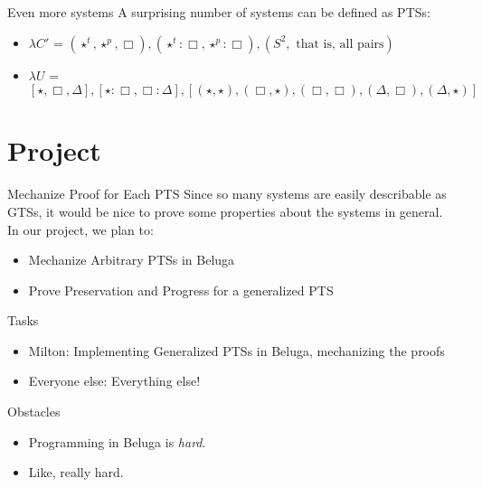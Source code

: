 \documentclass{beamer}
\begin{document}
    \begin{frame}{Even more systems}
        A surprising number of systems can be defined as PTSs:
        \begin{itemize}
            \item<1-> $\lambda C'$ = $(\star^t, \star^p, \Box), (\star^t : \Box, \star^p : \Box), (S^2, \text{ that is, all pairs})$
            \item<2-> $\lambda U$ = $[\star, \Box, \Delta], [\star : \Box, \Box : \Delta], [(\star, \star), (\Box, \star), (\Box, \Box), (\Delta, \Box), (\Delta, \star)]$
        \end{itemize}
    \end{frame}

    \section{Project}

    \begin{frame}{Mechanize Proof for Each PTS}
        Since so many systems are easily describable as GTSs, it would be nice to prove some properties about the systems in general. \\
        In our project, we plan to: 
        \begin{itemize}
            \item<1-> Mechanize Arbitrary PTSs in Beluga
            \item<2-> Prove Preservation and Progress for a generalized PTS
        \end{itemize}
    \end{frame}

    \begin{frame}{Tasks}
        \begin{itemize}
            \item<1-> Milton: Implementing Generalized PTSs in Beluga, mechanizing the proofs
            \item<2-> Everyone else: Everything else!
        \end{itemize}
    \end{frame}

    \begin{frame}{Obstacles}
        \begin{itemize}
            \item<1-> Programming in Beluga is \textit{hard}. 
            \item<2-> Like, really hard. 
        \end{itemize}
    \end{frame}
\end{document}
